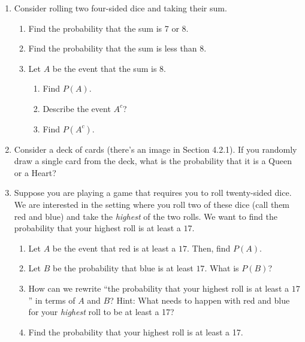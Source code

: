 \documentclass[
]{book}
\providecommand{\tightlist}{%
  \setlength{\itemsep}{0pt}\setlength{\parskip}{0pt}}
\begin{document}
\begin{enumerate}
\def\labelenumi{\arabic{enumi}.}
\tightlist
\item
  Consider rolling two four-sided dice and taking their sum.

  \begin{enumerate}
  \def\labelenumii{\alph{enumii}.}
  \tightlist
  \item
    Find the probability that the sum is 7 or 8.
  \item
    Find the probability that the sum is less than 8.
  \item
    Let \(A\) be the event that the sum is 8.

    \begin{enumerate}
    \def\labelenumiii{\roman{enumiii}.}
    \tightlist
    \item
      Find \(P(A)\).
    \item
      Describe the event \(A^c\)?
    \item
      Find \(P(A^c)\).
    \end{enumerate}
  \end{enumerate}
\item
  Consider a deck of cards (there's an image in Section 4.2.1). If you randomly draw a single card from the deck, what is the probability that it is a Queen or a Heart?
\item
  Suppose you are playing a game that requires you to roll twenty-sided dice. We are interested in the setting where you roll two of these dice (call them {red} and {blue}) and take the \emph{highest} of the two rolls. We want to find the probability that your highest roll is at least a \(17\).

  \begin{enumerate}
  \def\labelenumii{\alph{enumii}.}
  \tightlist
  \item
    Let \(A\) be the event that {red} is at least a \(17\). Then, find \(P(A)\).
  \item
    Let \(B\) be the probability that {blue} is at least \(17\). What is \(P(B)\)?
  \item
    How can we rewrite ``the probability that your highest roll is at least a \(17\)'' in terms of \(A\) and \(B\)? Hint: What needs to happen with {red} and {blue} for your \emph{highest} roll to be at least a 17?
  \item
    Find the probability that your highest roll is at least a 17.
  \end{enumerate}
\end{enumerate}
\end{document}
